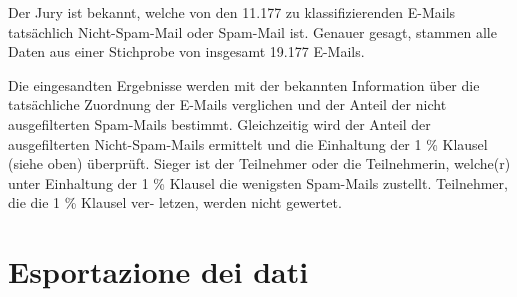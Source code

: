 Der Jury ist bekannt, welche von den 11.177 zu klassifizierenden
E-Mails tatsächlich Nicht-Spam-Mail oder Spam-Mail ist. Genauer
gesagt, stammen alle Daten aus einer Stichprobe von insgesamt
19.177 E-Mails.

Die eingesandten Ergebnisse werden mit der bekannten Information über
die tatsächliche Zuordnung der E-Mails verglichen und der Anteil der
nicht ausgefilterten Spam-Mails bestimmt. Gleichzeitig wird der Anteil
der ausgefilterten Nicht-Spam-Mails ermittelt und die Einhaltung
der 1 \% Klausel (siehe oben) überprüft. Sieger ist der Teilnehmer
oder die Teilnehmerin, welche(r) unter Einhaltung der 1 \% Klausel die
wenigsten Spam-Mails zustellt. Teilnehmer, die die 1 \% Klausel ver-
letzen, werden nicht gewertet.

\section{Esportazione dei dati}

